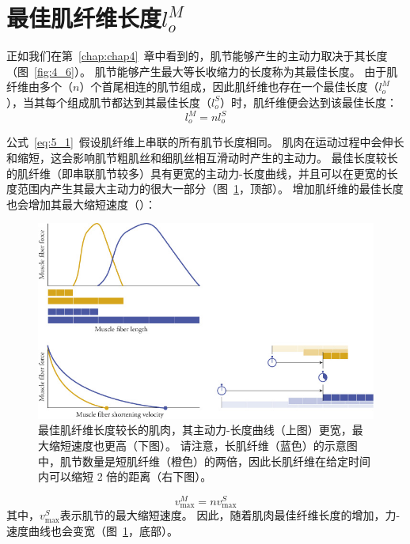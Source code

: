 \section{最佳肌纤维长度$l_o^M$}

正如我们在第~\ref{chap:chap4}~章中看到的，肌节能够产生的主动力取决于其长度（图~\ref{fig:4_6}）。
肌节能够产生最大等长收缩力的长度称为其最佳长度。
由于肌纤维由多个（$n$）个首尾相连的肌节组成，因此肌纤维也存在一个最佳长度（$l_o^M$），当其每个组成肌节都达到其最佳长度（$l_o^S$）时，肌纤维便会达到该最佳长度：
%
\begin{equation}
	l_o^M = n l_o^S \label{eq:5_1}
\end{equation}

公式~\ref{eq:5_1}~假设肌纤维上串联的所有肌节长度相同。
肌肉在运动过程中会伸长和缩短，这会影响肌节粗肌丝和细肌丝相互滑动时产生的主动力。
最佳长度较长的肌纤维（即串联肌节较多）具有更宽的主动力-长度曲线，并且可以在更宽的长度范围内产生其最大主动力的很大一部分（图~\ref{fig:5_2}，顶部）。
增加肌纤维的最佳长度也会增加其最大缩短速度（）：

\begin{figure}[!htb]
	\centering
	\includegraphics[width=1.0\linewidth]{chap5/5_2}
	\caption{最佳肌纤维长度较长的肌肉，其主动力-长度曲线（上图）更宽，最大缩短速度也更高（下图）。
		请注意，长肌纤维（蓝色）的示意图中，肌节数量是短肌纤维（橙色）的两倍，因此长肌纤维在给定时间内可以缩短 2 倍的距离（右下图）。 \label{fig:5_2}}
\end{figure}

\begin{equation}
	v_{\text{max}}^M = n v_{\text{max}}^S \label{eq:5_2}
\end{equation}
%
其中，$v_\text{max}^S$表示肌节的最大缩短速度。
因此，随着肌肉最佳纤维长度的增加，力-速度曲线也会变宽（图~\ref{fig:5_2}，底部）。


